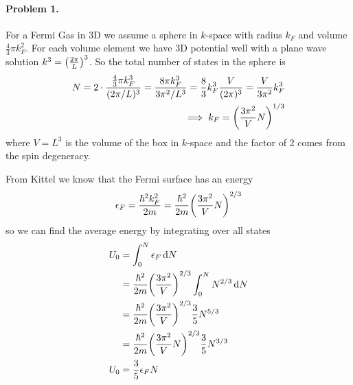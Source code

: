 \documentclass[../main.tex]{subfiles}
\begin{document}
\pagestyle{fancy}

\renewcommand\thefigure{\arabic{figure}} 
\paragraph*{Problem 1.} For a Fermi Gas in 3D we assume a sphere in $k$-space with radius $k_F$
and volume $\frac{4}{3} \pi k_F^2$. For each volume element we have 3D potential well with 
a plane wave solution $k^3 = \qt(\frac{2\pi}{L})^3$. So the total number of states in the sphere is
\begin{align*}
    N = 2 \cdot \frac{\frac{4}{3}\pi k_F^3}{(2\pi/L)^3} = \frac{8\pi k_F^3}{3\pi^2/L^3} 
    = \frac{8}{3}k_F^3 \frac{V}{(2\pi)^3} = \frac{V}{3\pi^2}k_F^3 \\
    \implies k_F = \qt(\frac{3\pi^2}{V}N)^{1/3}
\end{align*}
where $V = L^3$ is the volume of the box in $k$-space and the factor of 2 comes from the spin degeneracy.

From Kittel we know that the Fermi surface has an energy
\begin{align*}
    \epsilon_F = \frac{\hbar^2 k_F^2}{2m} = \frac{\hbar^2}{2m} \qt(\frac{3\pi^2}{V}N)^{2/3}
\end{align*}
so we can find the average energy by integrating over all states
\begin{align*}
    U_0 &= \int_0^N \epsilon_F \dd{N} \\
     &= \frac{\hbar^2}{2m} \qt(\frac{3\pi^2}{V})^{2/3} \int_0^N N^{2/3} \dd{N} \\
     &= \frac{\hbar^2}{2m} \qt(\frac{3\pi^2}{V})^{2/3} \frac{3}{5} N^{5/3} \\
     &= \frac{\hbar^2}{2m} \qt(\frac{3\pi^2}{V} N)^{2/3} \frac{3}{5} N^{3/3} \\
    U_0 &= \frac{3}{5} \epsilon_F N
\end{align*}
\end{document}
